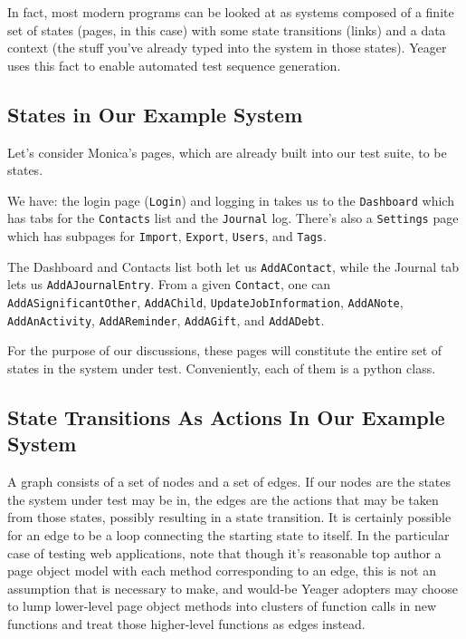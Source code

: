 In fact, most modern programs can be looked at as systems composed of a finite set of states (pages, in this case) with some state transitions (links) and a data context (the stuff you've already typed into the system in those states). Yeager uses this fact to enable automated test sequence generation.

\subsection{States in Our Example System}
Let's consider Monica's pages, which are already built into our test suite, to be states.

We have: the login page (\texttt{Login}) and logging in takes us to the \texttt{Dashboard} which has tabs for the \texttt{Contacts} list and the \texttt{Journal} log. There's also a \texttt{Settings} page which has subpages for \texttt{Import}, \texttt{Export}, \texttt{Users}, and \texttt{Tags}.

The Dashboard and Contacts list both let us \texttt{AddAContact}, while the Journal tab lets us \texttt{AddAJournalEntry}. From a given \texttt{Contact}, one can \texttt{AddASignificantOther}, \texttt{AddAChild}, \texttt{UpdateJobInformation}, \texttt{AddANote}, \texttt{AddAnActivity}, \texttt{AddAReminder}, \texttt{AddAGift}, and \texttt{AddADebt}.

For the purpose of our discussions, these pages will constitute the entire set of states in the system under test. Conveniently, each of them is a python class.

\subsection{State Transitions As Actions In Our Example System}
A graph consists of a set of nodes and a set of edges. If our nodes are the states the system under test may be in, the edges are the actions that may be taken from those states, possibly resulting in a state transition. It is certainly possible for an edge to be a loop connecting the starting state to itself. In the particular case of testing web applications, note that though it's reasonable top author a page object model with each method corresponding to an edge, this is not an assumption that is necessary to make, and would-be Yeager adopters may choose to lump lower-level page object methods into clusters of function calls in new functions and treat those higher-level functions as edges instead. %

